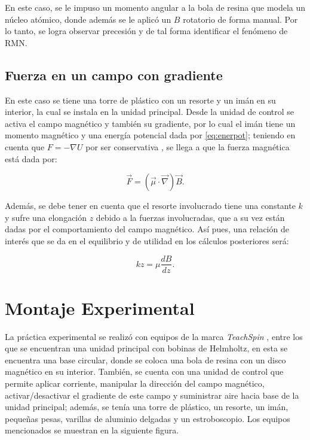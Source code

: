 \documentclass[%
 reprint,
 amsmath,amssymb,
 aps,
]{revtex4-1}
\begin{document}
En este caso, se le impuso un momento angular a la bola de resina que modela un núcleo atómico, donde además se le aplicó un $B$ rotatorio de forma manual. Por lo tanto, se logra observar precesión y de tal forma identificar el fenómeno de RMN.

\subsection{Fuerza en un campo con gradiente}

En este caso se tiene una torre de plástico con un resorte y un imán en su interior, la cual se instala en la unidad principal. Desde la unidad de control se activa el campo magnético y también su gradiente, por lo cual el imán tiene un momento magnético y una energía potencial dada por \ref{eq:enerpot}; teniendo en cuenta que $F = - \nabla U$ por ser conservativa \cite{prece}, se llega a que la fuerza magnética está dada por:

\begin{equation}
    \vec{F} = (\vec{\mu} \cdot \vec{\nabla}) \vec{B}.
    \label{eq:fuerza}
\end{equation}

Además, se debe tener en cuenta que el resorte involucrado tiene una constante $k$ y sufre una elongación $z$ debido a la fuerzas involucradas, que a su vez están dadas por el comportamiento del campo magnético. Así pues, una relación de interés que se da en el equilibrio y de utilidad en los cálculos posteriores será:

\begin{equation}
    kz = \mu \frac{dB}{dz}.
    \label{eq:equilibrio}
\end{equation}

\section{Montaje Experimental}

La práctica experimental se realizó con equipos de la marca \textit{TeachSpin} \cite{teach}, entre los que se encuentran una unidad principal con bobinas de Helmholtz, en esta se encuentra una base circular, donde se coloca una bola de resina con un disco magnético en su interior. También, se cuenta con una unidad de control que permite aplicar corriente, manipular la dirección del campo magnético,  activar/desactivar el gradiente de este campo y suministrar aire hacia base de la unidad principal; además, se tenía una torre de plástico, un resorte, un imán, pequeñas pesas, varillas de aluminio delgadas y un estroboscopio. Los equipos mencionados se muestran en la siguiente figura.
\end{document}
